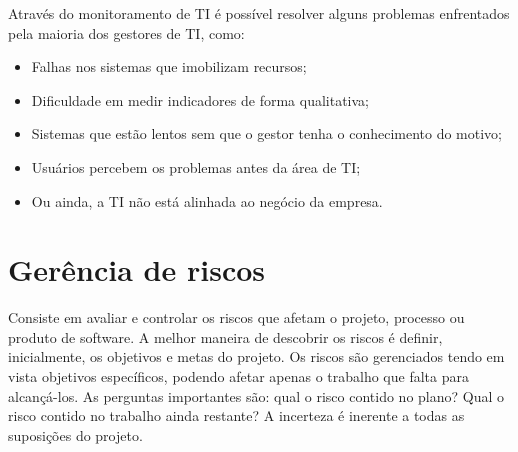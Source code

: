 \documentclass[12pt]{article}
\begin{document}
         \begin{table}[h]
            \centering
             \label{table:riscos_futuros}
            \caption{Riscos Futuros}
        \end{table}
        \FloatBarrier
        
        Através do monitoramento de TI é possível resolver alguns problemas enfrentados pela maioria dos gestores de TI, como:
        \begin{itemize}
               \item Falhas nos sistemas que imobilizam recursos;
               \item Dificuldade em medir indicadores de forma qualitativa;
                \item Sistemas que estão lentos sem que o gestor tenha o conhecimento do motivo;
                \item Usuários percebem os problemas antes da área de TI;
                \item Ou ainda, a TI não está alinhada ao negócio da empresa.
             \end{itemize}
        

    \section{Gerência de riscos}
        Consiste em avaliar e controlar os riscos que afetam o projeto, processo ou produto de software. A melhor maneira de descobrir os riscos é definir, inicialmente, os objetivos e metas do projeto. Os riscos são gerenciados tendo em vista objetivos específicos, podendo afetar apenas o trabalho que falta para alcançá-los. As perguntas importantes são: qual o risco contido no plano? Qual o risco contido no trabalho ainda restante? A incerteza é inerente a todas as suposições do projeto.	 
        
\end{document}
